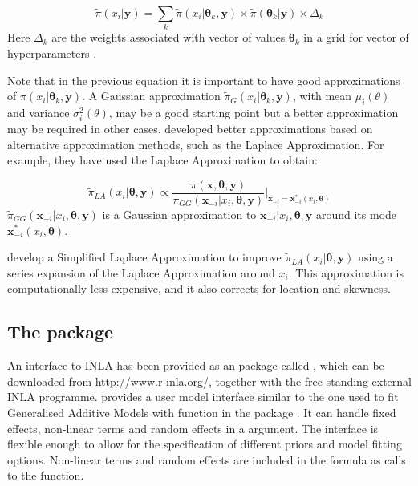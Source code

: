 \documentclass[article]{jss}
\begin{document}
\begin{equation}
\tilde\pi(x_i|\mathbf{y})= 
\sum_k \tilde\pi (x_i|\mathbf{\theta}_k, \mathbf{y})\times 
\tilde\pi(\mathbf{\theta}_k|\mathbf{y})\times \Delta_k
\end{equation}
\noindent
Here $\Delta_k$ are the weights associated with vector of values
$\mathbf{\theta}_k$ in a grid for vector of hyperparameters .


Note that in the previous equation it is important to have good approximations
of $\pi (x_i|\mathbf{\theta}_k, \mathbf{y})$. A Gaussian approximation
$\tilde\pi_G (x_i|\mathbf{\theta}_k, \mathbf{y})$, with mean $\mu_i(\theta)$
and variance $\sigma^2_i(\theta)$, may be a good starting point but a better
approximation may be required in other cases. \citet{isi:000264374200002}
developed better approximations based on alternative approximation methods,
such as the Laplace Approximation.  For example, they have used the Laplace
Approximation to obtain:

\begin{equation}
\tilde\pi_{LA}(x_i|\mathbf{\theta}, \mathbf{y}) \propto 
\frac{\pi(\mathbf{x}, \mathbf{\theta}, \mathbf{y})}
{\tilde\pi_{GG}(\mathbf{x}_{-i}|x_i, \mathbf{\theta}, \mathbf{y})}
\bigg|_{\mathbf{x}_{-i}=\mathbf{x}^*_{-i}(x_i, \mathbf{\theta})}
\end{equation}
\noindent
$\tilde\pi_{GG}(\mathbf{x}_{-i}|x_i, \mathbf{\theta}, \mathbf{y})$ is a
Gaussian  approximation to $\mathbf{x}_{-i}|x_i, \mathbf{\theta}, \mathbf{y}$
around its mode $\mathbf{x}^*_{-i}(x_i, \mathbf{\theta})$.

\citet{isi:000264374200002} develop a Simplified Laplace Approximation to
improve $\tilde\pi_{LA}(x_i|\mathbf{\theta}, \mathbf{y})$ using a series
expansion of the Laplace Approximation around $x_i$. This approximation is
computationally less expensive, and it also corrects for location and
skewness.


\subsection[The R-INLA package]{The  package}

An interface to INLA has been provided as an  package called ,
which can be downloaded from \url{http://www.r-inla.org/}, together with the free-standing external INLA programme. 
provides a user model interface similar to the one used to fit Generalised Additive
Models with function  in the  package \citep{Wood:2006}. %
It can handle fixed effects, non-linear terms
and random effects in a  argument. The interface is flexible
enough to allow for the specification of different priors and model fitting
options. Non-linear terms and random effects are included in the formula as
calls to the  function. 
\end{document}
